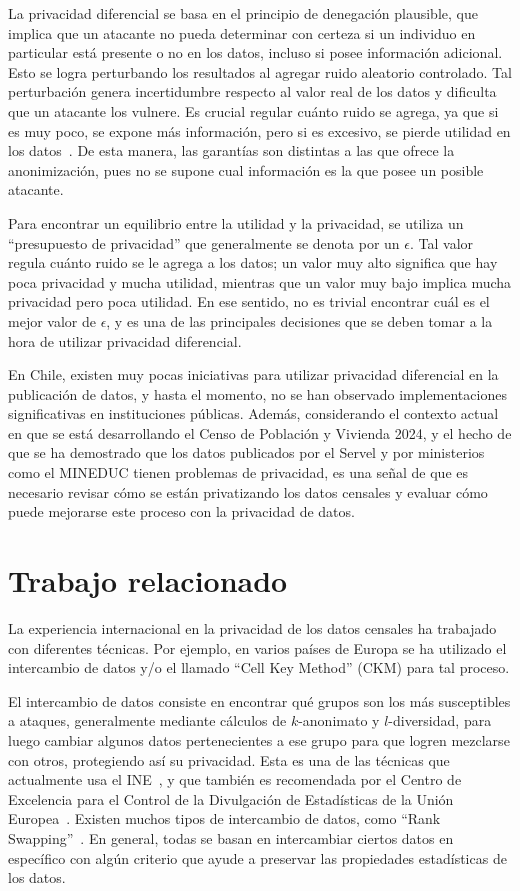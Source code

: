 \documentclass[informe]{upropuesta}
\begin{document}
La privacidad diferencial se basa en el principio de denegación plausible, que implica que un atacante no pueda determinar con certeza si un individuo en particular está presente o no en los datos, incluso si posee información adicional. Esto se logra perturbando los resultados al agregar ruido aleatorio controlado. Tal perturbación genera incertidumbre respecto al valor real de los datos y dificulta que un atacante los vulnere. Es crucial regular cuánto ruido se agrega, ya que si es muy poco, se expone más información, pero si es excesivo, se pierde utilidad en los datos~\cite{DBLP:journals/fttcs/DworkR14}. De esta manera, las garantías son distintas a las que ofrece la anonimización, pues no se supone cual información es la que posee un posible atacante.

Para encontrar un equilibrio entre la utilidad y la privacidad, se utiliza un “presupuesto de privacidad” que generalmente se denota por un $\epsilon$. Tal valor regula cuánto ruido se le agrega a los datos; un valor muy alto significa que hay poca privacidad y mucha utilidad, mientras que un valor muy bajo implica mucha privacidad pero poca utilidad. En ese sentido, no es trivial encontrar cuál es el mejor valor de $\epsilon$, y es una de las principales decisiones que se deben tomar a la hora de utilizar privacidad diferencial.

En Chile, existen muy pocas iniciativas para utilizar privacidad diferencial en la publicación de datos, y hasta el momento, no se han observado implementaciones significativas en instituciones públicas. Además, considerando el contexto actual en que se está desarrollando el Censo de Población y Vivienda 2024, y el hecho de que se ha demostrado que los datos publicados por el Servel y por ministerios como el MINEDUC tienen problemas de privacidad, es una señal de que es necesario revisar cómo se están privatizando los datos censales y evaluar cómo puede mejorarse este proceso con la privacidad de datos.

\section{Trabajo relacionado}

La experiencia internacional en la privacidad de los datos censales ha trabajado con diferentes técnicas. Por ejemplo, en varios países de Europa se ha utilizado el intercambio de datos y/o el llamado “Cell Key Method” (CKM) para tal proceso. 

El intercambio de datos consiste en encontrar qué grupos son los más susceptibles a ataques, generalmente mediante cálculos de $k$-anonimato y $l$-diversidad, para luego cambiar algunos datos pertenecientes a ese grupo para que logren mezclarse con otros, protegiendo así su privacidad. Esta es una de las técnicas que actualmente usa el INE~\cite{manualINE}, y que también es recomendada por el Centro de Excelencia para el Control de la Divulgación de Estadísticas de la Unión Europea~\cite{SDCHandbook2023}. Existen muchos tipos de intercambio de datos, como “Rank Swapping”~\cite{rankSwapping}. En general, todas se basan en intercambiar ciertos datos en específico con algún criterio que ayude a preservar las propiedades estadísticas de los datos. 
\end{document}
